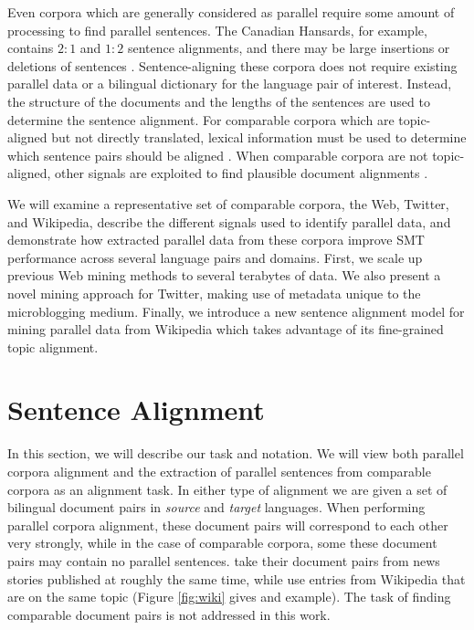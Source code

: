 Even corpora which are generally considered as parallel require some amount of
processing to find parallel sentences. The Canadian Hansards, for example,
contains $2:1$ and $1:2$ sentence alignments, and
there may be large insertions or deletions of sentences \citep{Gale93,Chen93}.
Sentence-aligning these corpora does not require existing parallel data or a
bilingual dictionary for the language pair of interest. Instead, the structure
of the documents and the lengths of the sentences are used to determine the
sentence alignment. For comparable corpora which are topic-aligned but not
directly translated, lexical information must be used to determine which
sentence pairs should be aligned \citep{Munteanu05}. When comparable corpora are
not topic-aligned, other signals are exploited to find plausible document
alignments \citep{Resnik03}.

We will examine a representative set of comparable corpora, the Web, Twitter,
and Wikipedia, describe the different signals used to identify parallel data,
and demonstrate how extracted parallel data from these corpora improve SMT
performance across several language pairs and domains. First, we scale up
previous Web mining methods \citep{Resnik03} to several terabytes of data. We
also present a novel mining approach for Twitter, making use of metadata unique
to the microblogging medium. Finally, we introduce a new sentence alignment
model for mining parallel data from Wikipedia which takes advantage of its
fine-grained topic alignment.

\section{Sentence Alignment}
In this section, we will describe our task and notation.
We will view both parallel corpora alignment and the extraction of parallel
sentences from comparable corpora as an alignment task. In either type of
alignment we are given a set of bilingual document pairs in {\em source} and {\em
target} languages. When performing parallel corpora alignment, these document
pairs will correspond to each other very strongly, while in the case of
comparable corpora, some these document pairs may contain no parallel sentences.
\citet{Munteanu05} take their document pairs from news stories published at
roughly the same time, while \citet{Adafre06,Smith10} use entries from
Wikipedia that are on the same topic (Figure \ref{fig:wiki} gives and example).
The task of finding comparable document pairs is not addressed in this work.

